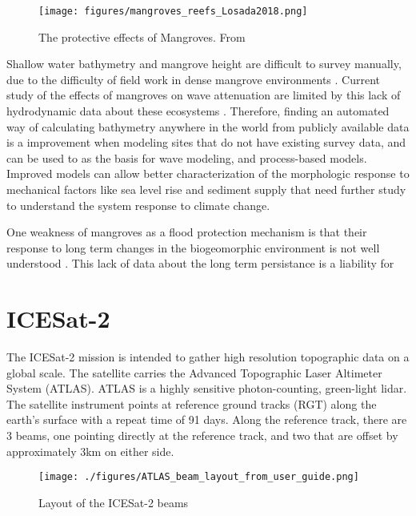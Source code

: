 \begin{figure}[htbp]
      \centering
      \texttt{[image: figures/mangroves\_reefs\_Losada2018.png]}
      \caption{The protective effects of Mangroves. From \parencite{Losada2018}}
      \label{mangrove-protection-diagram}
\end{figure}


Shallow water bathymetry and mangrove height are difficult to survey manually, due to the difficulty of field work in dense mangrove environments \parencite{Gijsman2021}. Current study of the effects of mangroves on wave attenuation are limited by this lack of hydrodynamic data about these ecosystems \parencite{Horstman2014}.  Therefore, finding an automated way of calculating bathymetry anywhere in the world from publicly available data is a improvement when modeling sites that do not have existing survey data, and can be used to as the basis for wave modeling, and process-based models. Improved models can allow better characterization of the morphologic response to mechanical factors like sea level rise and sediment supply that need further study to understand the system response to climate change.

One weakness of mangroves as a flood protection mechanism is that their response to long term changes in the biogeomorphic environment is not well understood \parencite{Gijsman2021}. This lack of data about the long term persistance is a liability for

\section{ICESat-2}

The ICESat-2 mission is intended to gather high resolution topographic data on a global scale. The satellite carries the Advanced Topographic Laser Altimeter System (ATLAS). ATLAS is a highly sensitive photon-counting, green-light lidar. The satellite instrument points at reference ground tracks (RGT) along the earth's surface with a repeat time of 91 days. Along the reference track, there are 3 beams, one pointing directly at the reference track, and two that are offset by approximately 3km on either side.

\begin{figure}
      \centering
      \texttt{[image: ./figures/ATLAS\_beam\_layout\_from\_user\_guide.png]}
      \caption{Layout of the ICESat-2 beams}
\end{figure}

